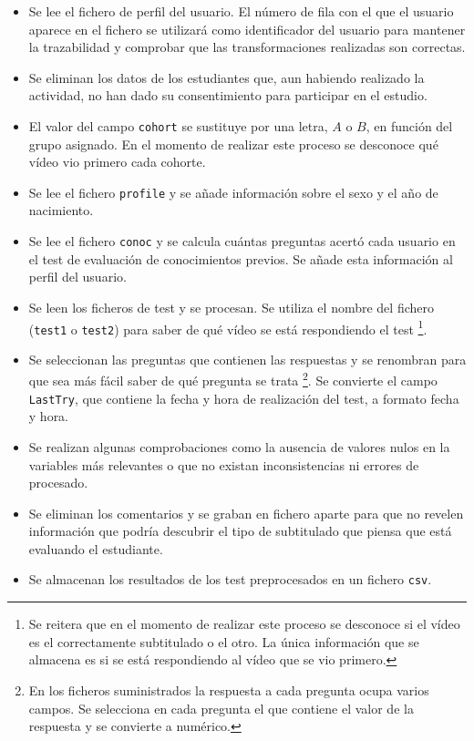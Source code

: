 \documentclass[
  12pt,
  a4paper,
  extrafontsizes,
  onecolumn,
  openright,
  table]{memoir}
\newlength{\rf}
\begin{document}
\begin{itemize}
\item
  Se lee el fichero de perfil del usuario. El número de fila con el que
  el usuario aparece en el fichero se utilizará como identificador del
  usuario para mantener la trazabilidad y comprobar que las
  transformaciones realizadas son correctas.
\item
  Se eliminan los datos de los estudiantes que, aun habiendo realizado
  la actividad, no han dado su consentimiento para participar en el
  estudio.
\item
  El valor del campo \texttt{cohort} se sustituye por una letra, \(A\) o
  \(B\), en función del grupo asignado. En el momento de realizar este
  proceso se desconoce qué vídeo vio primero cada cohorte.
\item
  Se lee el fichero \texttt{profile} y se añade información sobre el
  sexo y el año de nacimiento.
\item
  Se lee el fichero \texttt{conoc} y se calcula cuántas preguntas acertó
  cada usuario en el test de evaluación de conocimientos previos. Se
  añade esta información al perfil del usuario.
\item
  Se leen los ficheros de test y se procesan. Se utiliza el nombre del
  fichero (\texttt{test1} o \texttt{test2}) para saber de qué vídeo se
  está respondiendo el test \footnote{Se reitera que en el momento de
    realizar este proceso se desconoce si el vídeo es el correctamente
    subtitulado o el otro. La única información que se almacena es si se
    está respondiendo al vídeo que se vio primero.}.
\item
  Se seleccionan las preguntas que contienen las respuestas y se
  renombran para que sea más fácil saber de qué pregunta se trata
  \footnote{En los ficheros suministrados la respuesta a cada pregunta
    ocupa varios campos. Se selecciona en cada pregunta el que contiene
    el valor de la respuesta y se convierte a numérico.}. Se convierte
  el campo \texttt{LastTry}, que contiene la fecha y hora de realización
  del test, a formato fecha y hora.
\item
  Se realizan algunas comprobaciones como la ausencia de valores nulos
  en la variables más relevantes o que no existan inconsistencias ni
  errores de procesado.
\item
  Se eliminan los comentarios y se graban en fichero aparte para que no
  revelen información que podría descubrir el tipo de subtitulado que
  piensa que está evaluando el estudiante.
\item
  Se almacenan los resultados de los test preprocesados en un fichero
  \texttt{csv}.
\end{itemize}
\end{document}
